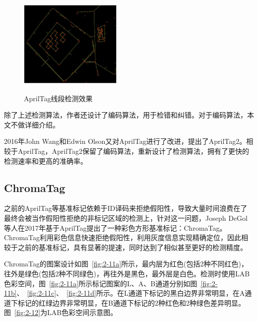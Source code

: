 \begin{figure}[htb]
\begin{minipage}[t]{0.33\linewidth}
		\label{fig:2-10d} 
	\end{minipage}
	\begin{minipage}[t]{0.33\linewidth}
		\centering
		\includegraphics[width=\columnwidth]{figures/2-10e.png} 
		\label{fig:2-10e} 
	\end{minipage}
	\caption{AprilTag线段检测效果}
	\label{fig:2-10}
\end{figure}

除了上述检测算法，作者还设计了编码算法，用于检错和纠错。对于编码算法，本文不做详细介绍。

2016年John Wang和Edwin Olson又对AprilTag进行了改进，提出了AprilTag2。相较于AprilTag，AprilTag2保留了编码算法，重新设计了检测算法，拥有了更快的检测速率和更高的准确率。

\subsection{ChromaTag}
之前的AprilTag等基准标记依赖于ID译码来拒绝假阳性，导致大量时间浪费在了最终会被当作假阳性拒绝的非标记区域的检测上，针对这一问题，Joseph DeGol等人在2017年基于AprilTag提出了一种彩色方形基准标记：ChromaTag。ChromaTag利用彩色信息快速拒绝假阳性，利用灰度信息实现精确定位，因此相较于之前的基准标记，具有显著的提速，同时达到了相似甚至更好的检测精度。

ChromaTag的图案设计如图~\ref{fig:2-11a}所示，最内层为红色(包括2种不同红色)，往外是绿色(包括2种不同绿色)，再往外是黑色，最外层是白色。检测时使用LAB色彩空间，图~\ref{fig:2-11a}所示标记图案的L、A、B通道分别如图~\ref{fig:2-11b}、~\ref{fig:2-11c}、~\ref{fig:2-11d}所示。在L通道下标记的黑白边界非常明显，在A通道下标记的红绿边界非常明显，在B通道下标记的2种红色和2种绿色差异明显。图~\ref{fig:2-12}为LAB色彩空间示意图。


